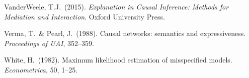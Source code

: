 \documentclass[12pt]{article}
\begin{document}
\begin{description}[leftmargin=1.8em, labelindent=0pt, itemsep=3pt]
  \item VanderWeele, T.J.\ (2015).
    \textit{Explanation in Causal Inference: Methods for Mediation
    and Interaction}. Oxford University Press.

  \item Verma, T.\ \& Pearl, J.\ (1988).
    Causal networks: semantics and expressiveness.
    \textit{Proceedings of UAI}, 352--359.

  \item White, H.\ (1982).
    Maximum likelihood estimation of misspecified models.
    \textit{Econometrica}, 50, 1--25.
\end{description}
\endgroup
\end{document}
